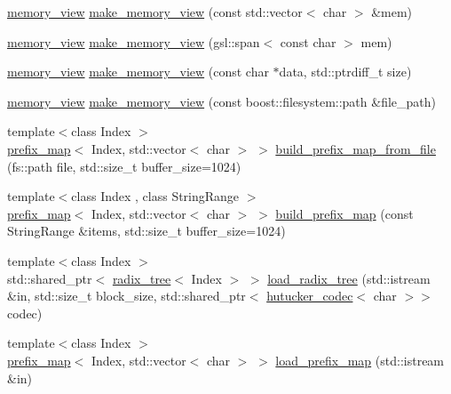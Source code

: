 \begin{DoxyCompactItemize}
\item 
\mbox{\hyperlink{classirk_1_1memory__view}{memory\+\_\+view}} \mbox{\hyperlink{namespaceirk_a7065a12b7b7c5dd5aad84394da95871b}{make\+\_\+memory\+\_\+view}} (const std\+::vector$<$ char $>$ \&mem)
\item 
\mbox{\hyperlink{classirk_1_1memory__view}{memory\+\_\+view}} \mbox{\hyperlink{namespaceirk_ac123106f771ea0ef0ee855f8ee98bc2b}{make\+\_\+memory\+\_\+view}} (gsl\+::span$<$ const char $>$ mem)
\item 
\mbox{\hyperlink{classirk_1_1memory__view}{memory\+\_\+view}} \mbox{\hyperlink{namespaceirk_a18d9d6db7e3598a806378b697fabb802}{make\+\_\+memory\+\_\+view}} (const char $\ast$data, std\+::ptrdiff\+\_\+t size)
\item 
\mbox{\hyperlink{classirk_1_1memory__view}{memory\+\_\+view}} \mbox{\hyperlink{namespaceirk_af0a614c4c802be8ef7136278c00c1377}{make\+\_\+memory\+\_\+view}} (const boost\+::filesystem\+::path \&file\+\_\+path)
\item 
{\footnotesize template$<$class Index $>$ }\\\mbox{\hyperlink{classirk_1_1prefix__map}{prefix\+\_\+map}}$<$ Index, std\+::vector$<$ char $>$ $>$ \mbox{\hyperlink{namespaceirk_aae903af083f9e6a98e9d5f232322a2f2}{build\+\_\+prefix\+\_\+map\+\_\+from\+\_\+file}} (fs\+::path file, std\+::size\+\_\+t buffer\+\_\+size=1024)
\item 
{\footnotesize template$<$class Index , class String\+Range $>$ }\\\mbox{\hyperlink{classirk_1_1prefix__map}{prefix\+\_\+map}}$<$ Index, std\+::vector$<$ char $>$ $>$ \mbox{\hyperlink{namespaceirk_a9e498e43015b0fba26ed452bb2981d21}{build\+\_\+prefix\+\_\+map}} (const String\+Range \&items, std\+::size\+\_\+t buffer\+\_\+size=1024)
\item 
{\footnotesize template$<$class Index $>$ }\\std\+::shared\+\_\+ptr$<$ \mbox{\hyperlink{classirk_1_1radix__tree}{radix\+\_\+tree}}$<$ Index $>$ $>$ \mbox{\hyperlink{namespaceirk_a11724f6a30a7fb17f24d0941fa00568d}{load\+\_\+radix\+\_\+tree}} (std\+::istream \&in, std\+::size\+\_\+t block\+\_\+size, std\+::shared\+\_\+ptr$<$ \mbox{\hyperlink{classirk_1_1hutucker__codec}{hutucker\+\_\+codec}}$<$ char $>$$>$ codec)
\item 
{\footnotesize template$<$class Index $>$ }\\\mbox{\hyperlink{classirk_1_1prefix__map}{prefix\+\_\+map}}$<$ Index, std\+::vector$<$ char $>$ $>$ \mbox{\hyperlink{namespaceirk_af1497304f9dcf5e7b72fcd6a6b607c22}{load\+\_\+prefix\+\_\+map}} (std\+::istream \&in)
$$
\end{DoxyCompactItemize}
